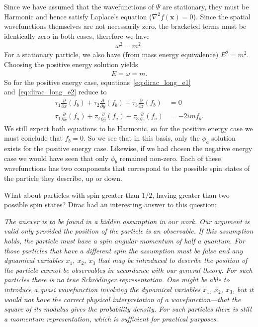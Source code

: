 \documentclass[titlepage,letterpaper,onecolumn,11pt,final]{report}
\numberwithin{equation}{section}
\numberwithin{figure}{section}
\begin{document}
Since we have assumed that the wavefunctions of $\Psi$ are stationary, they must be Harmonic and hence satisfy Laplace's equation ($\nabla^{2} f(\mathbf{x}) = 0$). Since the spatial wavefunctions themselves are not necessarily zero, the bracketed terms must be identically zero in both cases, therefore we have
\begin{align}
	\omega^{2} = m^{2}.
\end{align}
For a stationary particle, we also have (from mass energy equivalence) $E^{2} = m^{2}$. Choosing the positive energy solution yields
\begin{align}
	E = \omega = m.
\end{align}
%
So for the positive energy case, equations~\ref{eq:dirac_long_e1} and~\ref{eq:dirac_long_e2} reduce to
\begin{subequations}
\begin{align}
	\tau_{1} \frac{\partial}{\partial x} \left( f_{b} \right) + \tau_{2} \frac{\partial}{\partial y} \left( f_{b} \right) + \tau_{3} \frac{\partial}{\partial z} \left( f_{b} \right) &= 0 \\
	\tau_{1} \frac{\partial}{\partial x} \left( f_{a} \right) + \tau_{2} \frac{\partial}{\partial y} \left( f_{a} \right) + \tau_{3} \frac{\partial}{\partial z} \left( f_{a} \right) &= -2 i m f_{b}.
\end{align}
\end{subequations}
We still expect both equations to be Harmonic, so for the positive energy case we must conclude that $f_{b} = 0$. So we see that in this basis, only the $\phi_{a}$ solution exists for the positive energy case. Likewise, if we had chosen the negative energy case we would have seen that only $\phi_{b}$ remained non-zero. Each of these wavefunctions has two components that correspond to the possible spin states of the particle they describe, up or down.

What about particles with spin greater than $1/2$, having greater than two possible spin states? Dirac had an interesting answer to this question:
\begin{displayquote}
\emph{The answer is to be found in a hidden assumption in our work. Our argument is valid only provided the position of the particle is an observable. If this assumption holds, the particle must have a spin angular momentum of half a quantum. For those particles that have a different spin the assumption must be false and any dynamical variables $x_{1}$, $x_{2}$, $x_{3}$ that may be introduced to describe the position of the particle cannot be observables in accordance with our general theory. For such particles there is no true Schr\"{o}dinger representation. One might be able to introduce a quasi wavefunction involving the dynamical variables $x_{1}$, $x_{2}$, $x_{3}$, but it would not have the correct physical interpretation of a wavefunction---that the square of its modulus gives the probability density. For such particles there is still a momentum representation, which is sufficient for practical purposes.}
\end{displayquote}
\end{document}
